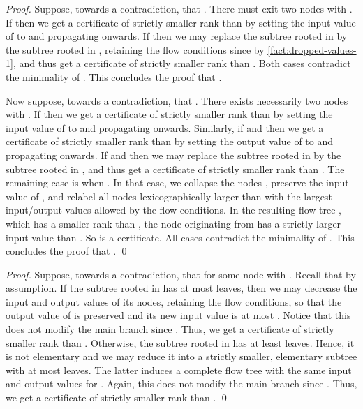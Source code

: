 \FactBranchDepthBound*
\begin{proof}
  Suppose, towards a contradiction, that .
  There must exit two nodes 
  with .
  If  then we get a certificate 
  of strictly smaller rank than  by setting the input value
  of  to  and propagating onwards.
  If  then we may replace
  the subtree rooted in  by the subtree rooted in ,
  retaining the flow conditions since 
  by \cref{fact:dropped-values-1},
  and thus get a certificate
  of strictly smaller rank than .
  Both cases contradict the minimality of .
  This concludes the proof that .

  Now suppose, towards a contradiction, that .
  There exists necessarily two nodes 
  with .
  If  then we get a certificate 
  of strictly smaller rank than  by setting the input value
  of  to  and propagating onwards.
  Similarly,
  if  and 
  then we get a certificate 
  of strictly smaller rank than  by setting the output value
  of  to  and propagating onwards.
  If  and  then we may replace
  the subtree rooted in  by the subtree rooted in ,
  and thus get a certificate
  of strictly smaller rank than .
  The remaining case is when .
  In that case,
  we collapse the nodes ,
  preserve the input value of ,
  and relabel all nodes lexicographically larger than 
  with the largest input/output values allowed by the flow conditions.
  In the resulting flow tree ,
  which has a smaller rank than ,
  the node  originating from  has a strictly larger input value than .
  So  is a certificate.
  All cases contradict the minimality of .
  This concludes the proof that .
 \qed
\end{proof}

\FactTraversalInequation*
\begin{proof}
  Suppose, towards a contradiction,
  that  for some node 
  with .
  Recall that  by assumption.
  If the subtree rooted in  has at most  leaves,
  then we may decrease the input and output values of its nodes,
  retaining the flow conditions,
  so that the output value of  is preserved and its new input value
  is at most .
  Notice that this does not modify the main branch since .
  Thus,
  we get a certificate of strictly smaller rank than .
  Otherwise,
  the subtree rooted in  has at least  leaves.
  Hence,
  it is not elementary
  and we may reduce it into a strictly smaller,
  elementary subtree with at most  leaves.
  The latter induces a complete flow tree
  with the same input and output values for .
  Again,
  this does not modify the main branch since .
  Thus,
  we get a certificate of strictly smaller rank than .
  \qed
\end{proof}

